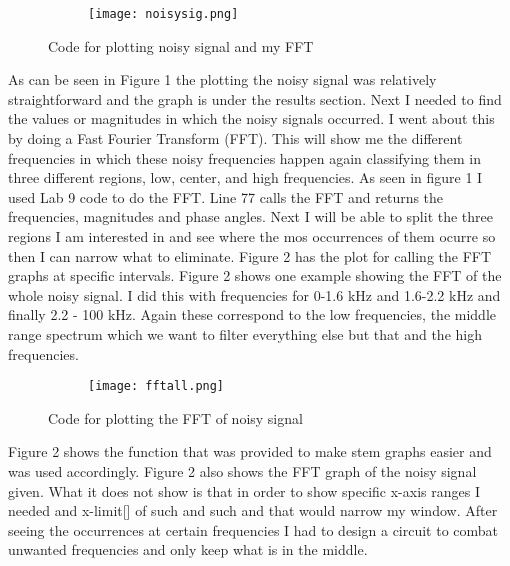 \documentclass[12pt,a4paper]{article}
\begin{document}
\begin{figure}[h]
\centering
\begin{subfigure}{ 1\textwidth}
\texttt{[image: noisysig.png]}
\end{subfigure}
\caption{ Code for plotting noisy signal and my FFT}
\label{fig2:image22}
\end{figure}




\clearpage

As can be seen in Figure 1 the plotting the noisy signal was relatively straightforward and the graph is under the results section. Next I needed to find the values or magnitudes in which the noisy signals occurred. I went about this by doing  a Fast Fourier Transform (FFT). This will show me the different frequencies in which these noisy frequencies happen again classifying them in three different regions, low, center, and high frequencies. As seen in figure 1 I used Lab 9 code to do the FFT. Line 77 calls the FFT and returns the frequencies, magnitudes and phase angles. Next I will be able to split the three regions I am interested in and see where the mos occurrences of them ocurre so then I can narrow what to eliminate. Figure 2 has the plot for calling the FFT graphs at specific intervals. Figure 2 shows one example showing the FFT of the whole noisy signal. I did this with frequencies for 0-1.6 kHz and 1.6-2.2 kHz and finally 2.2 - 100 kHz. Again these correspond to the low frequencies, the middle range spectrum which we want to filter everything else but that and the high frequencies. 


\begin{figure}[h]
\centering
\begin{subfigure}{ 1\textwidth}
\texttt{[image: fftall.png]}
\end{subfigure}
\caption{ Code for plotting the FFT of noisy signal}
\label{fig2:image22}
\end{figure}

Figure 2 shows the function that was provided to make stem graphs easier and was used accordingly. Figure 2 also shows the FFT graph of the noisy signal given. What it does not show is that in order to show specific x-axis ranges I needed and x-limit[] of such and such and that would narrow my window. After seeing the occurrences at certain frequencies I had to design a circuit to combat unwanted frequencies and only keep what is in the middle. 
\end{document}
